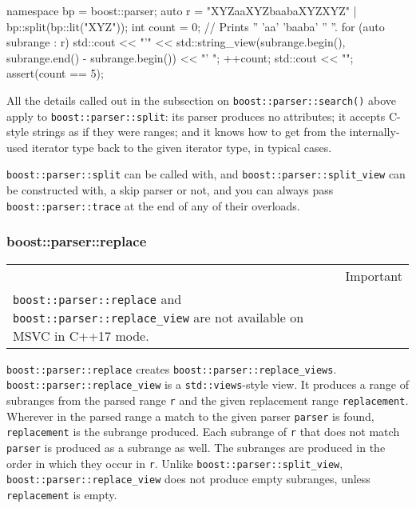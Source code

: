 \begin{code}
namespace bp = boost::parser;
auto r = "XYZaaXYZbaabaXYZXYZ" | bp::split(bp::lit("XYZ"));
int count = 0;
// Prints '' 'aa' 'baaba' '' ''.
for (auto subrange : r) {
    std::cout << "'" << std::string_view(subrange.begin(), subrange.end() - subrange.begin()) << "' ";
    ++count;
}
std::cout << "\n";
assert(count == 5);
\end{code}

All the details called out in the subsection on \texttt{boost::parser::search()} above apply to \texttt{boost::parser::split}: its parser produces no attributes; it accepts C-style strings as if they were ranges; and it knows how to get from the internally-used iterator type back to the given iterator type, in typical cases.

\texttt{boost::parser::split} can be called with, and \texttt{boost::parser::split\_view} can be constructed with, a skip parser or not, and you can always pass \texttt{boost::parser::trace} at the end of any of their overloads.

\subsubsection{boost::parser::replace}

\begin{longtable}[]{@{}
  >{\raggedright\arraybackslash}p{}
  >{\raggedright\arraybackslash}p{}@{}}
\toprule\noalign{}
\endhead
\bottomrule\noalign{}
\endlastfoot
\begin{minipage}[t]{\linewidth}\raggedright
\end{minipage} & Important \\
\texttt{boost::parser::replace} and \texttt{boost::parser::replace\_view} are not available on MSVC in C++17 mode. & \\
\end{longtable}

\texttt{boost::parser::replace} creates \texttt{boost::parser::replace\_views}. \texttt{boost::parser::replace\_view} is a \texttt{std::views}-style view. It produces a range of subranges from the parsed range \texttt{r} and the given replacement range \texttt{replacement}. Wherever in the parsed range a match to the given parser \texttt{parser} is found, \texttt{replacement} is the subrange produced. Each subrange of \texttt{r} that does not match \texttt{parser} is produced as a subrange as well. The subranges are produced in the order in which they occur in \texttt{r}. Unlike \texttt{boost::parser::split\_view}, \texttt{boost::parser::replace\_view} does not produce empty subranges, unless \texttt{replacement} is empty.


